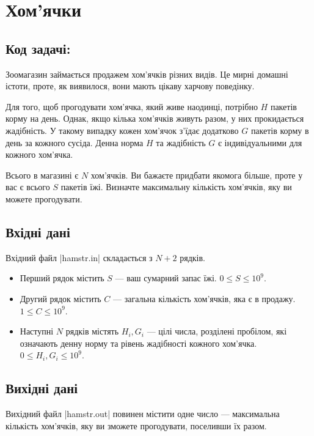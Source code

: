 \documentclass[12pt,a4paper]{article}
\begin{document}
\section*{Хом’ячки \hfill {}}


\subsection*{Код задачі: }

Зоомагазин займається продажем хом’ячків різних видів. Це мирні домашні істоти, проте, як виявилося, вони мають цікаву харчову поведінку.

Для того, щоб прогодувати хом’ячка, який живе наодинці, потрібно \(H\) пакетів корму на день. Однак, якщо кілька хом’ячків живуть разом, у них прокидається жадібність. У такому випадку кожен хом’ячок з’їдає додатково \(G\) пакетів корму в день за кожного сусіда. Денна норма \(H\) та жадібність \(G\) є індивідуальними для кожного хом’ячка.

Всього в магазині є \(N\) хом’ячків. Ви бажаєте придбати якомога більше, проте у вас є всього \(S\) пакетів їжі. Визначте максимальну кількість хом’ячків, яку ви можете прогодувати.


\subsection*{Вхідні дані}

Вхідний файл |hamstr.in| складається з \(N + 2\) рядків.

\begin{itemize}
    \item Перший рядок містить \(S\) --- ваш сумарний запас їжі. \(0 \leq S \leq 10^9 \).
    \item Другий рядок містить \(C\) --- загальна кількість хом’ячків, яка є в продажу. \(1 \leq C \leq 10^9 \).
    \item Наступні \(N\) рядків містять \(H_i, G_i\) --- цілі числа, розділені пробілом, які означають денну норму та рівень жадібності кожного хом’ячка. \(0 \leq H_i, G_i \leq 10^9 \).
\end{itemize}


\subsection*{Вихідні дані}

Вихідний файл |hamstr.out| повинен містити одне число --- максимальна кількість хом’ячків, яку ви зможете прогодувати, поселивши їх разом.
\end{document}

